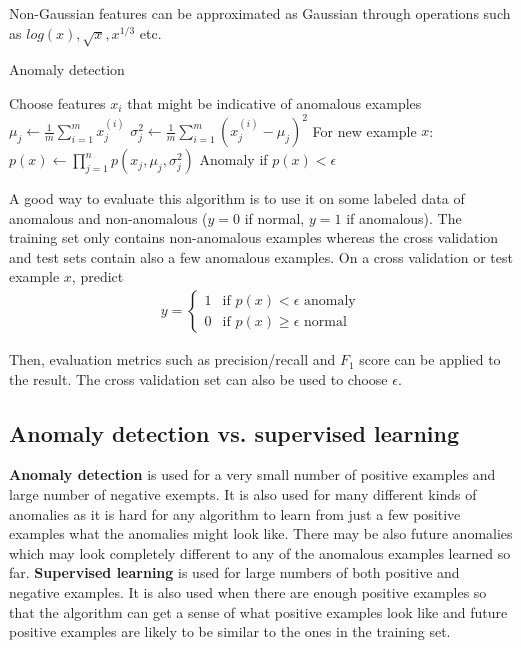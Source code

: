 \documentclass{report}
\begin{document}
Non-Gaussian features can be approximated as Gaussian through operations such as $log(x), \sqrt{x}, x^{1/3}$ etc.

\begin{algorithm}
\caption{Anomaly detection}
\label{ref:anomalydetection}
\begin{algorithmic}
\State Choose features $x_i$ that might be indicative of anomalous examples
\State $\mu_j \gets \frac{1}{m}\sum_{i=1}^{m}x_j^{(i)}$ 
\State $\sigma_j^2 \gets \frac{1}{m}\sum_{i=1}^{m}(x_j^{(i)}-\mu_j)^2$
\State For new example $x$: $p(x) \gets \prod_{j=1}^np(x_j,\mu_j,\sigma_j^2)$ 
\State Anomaly if $p(x) < \epsilon$
\end{algorithmic}
\end{algorithm}

A good way to evaluate this algorithm is to use it on some labeled data of anomalous and non-anomalous ($y=0$ if normal, $y=1$ if anomalous). The training set only contains non-anomalous examples whereas the cross validation and test sets contain also a few anomalous examples. On a cross validation or test example $x$, predict
\begin{align*}
y = \left\{
\begin{array}{lll}
1  & \mbox{if } p(x) < \epsilon \mbox{ anomaly} \\
0  & \mbox{if } p(x) \ge \epsilon \mbox{ normal}
\end{array}
\right.
\end{align*}

Then, evaluation metrics such as precision/recall and $F_1$ score can be applied to the result. The cross validation set can also be used to choose $\epsilon$.

\subsection{Anomaly detection vs. supervised learning}
{\bf Anomaly detection} is used for a very small number of positive examples and large number of negative exempts. It is also used for many different kinds of anomalies as it is hard for any algorithm to learn from just a few positive examples what the anomalies might look like. There may be also future anomalies which may look completely different to any of the anomalous examples learned so far. {\bf Supervised learning} is used for large numbers of both positive and negative examples. It is also used when there are enough positive examples so that the algorithm can get a sense of what positive examples look like and future positive examples are likely to be similar to the ones in the training set.
\end{document}
